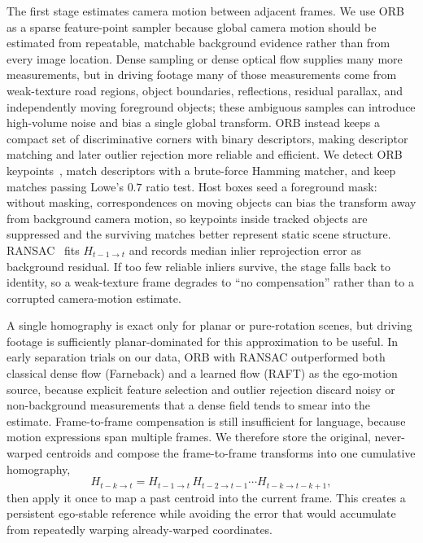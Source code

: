 \documentclass[sigconf,anonymous,nonacm]{acmart}
\begin{document}
The first stage estimates camera motion between adjacent frames. We use ORB as a sparse feature-point sampler because global camera motion should be estimated from repeatable, matchable background evidence rather than from every image location. Dense sampling or dense optical flow supplies many more measurements, but in driving footage many of those measurements come from weak-texture road regions, object boundaries, reflections, residual parallax, and independently moving foreground objects; these ambiguous samples can introduce high-volume noise and bias a single global transform. ORB instead keeps a compact set of discriminative corners with binary descriptors, making descriptor matching and later outlier rejection more reliable and efficient. We detect ORB keypoints~\cite{orb}, match descriptors with a brute-force Hamming matcher, and keep matches passing Lowe's $0.7$ ratio test. Host boxes seed a foreground mask: without masking, correspondences on moving objects can bias the transform away from background camera motion, so keypoints inside tracked objects are suppressed and the surviving matches better represent static scene structure. RANSAC~\cite{ransac} fits $H_{t-1\to t}$ and records median inlier reprojection error as background residual. If too few reliable inliers survive, the stage falls back to identity, so a weak-texture frame degrades to ``no compensation'' rather than to a corrupted camera-motion estimate.

A single homography is exact only for planar or pure-rotation scenes, but driving footage is sufficiently planar-dominated for this approximation to be useful. In early separation trials on our data, ORB with RANSAC outperformed both classical dense flow (Farneback) and a learned flow (RAFT) as the ego-motion source, because explicit feature selection and outlier rejection discard noisy or non-background measurements that a dense field tends to smear into the estimate. Frame-to-frame compensation is still insufficient for language, because motion expressions span multiple frames. We therefore store the original, never-warped centroids and compose the frame-to-frame transforms into one cumulative homography,
\begin{equation}
H_{t-k\to t} = H_{t-1\to t}\, H_{t-2\to t-1} \cdots H_{t-k\to t-k+1},
\label{eq:cumulative}
\end{equation}
then apply it once to map a past centroid into the current frame. This creates a persistent ego-stable reference while avoiding the error that would accumulate from repeatedly warping already-warped coordinates.
\end{document}
